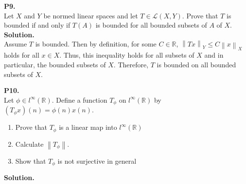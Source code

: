 \documentclass{article}
\newcommand{\norm}[1]{\left\lVert#1\right\rVert}
\begin{document}
    \newpage

    \textbf{P9.}\\

    Let $X$ and $Y$ be normed linear spaces and let $T\in\mathcal{L}(X,Y)$. Prove that $T$ is bounded if and only if $T(A)$ is
    bounded for all bounded subsets of $A$ of $X$.\\

    \textbf{Solution.}\\

    Assume $T$ is bounded. Then by definition, for some $C\in\mathbb{R}$, $\norm{Tx}_Y \leq C\norm{x}_X$ holds for all $x\in X$.
    Thus, this inequality holds for all subsets of $X$ and in particular, the bounded subsets of $X$. Therefore, $T$ is bounded
    on all bounded subsets of $X$.

    \textbf{P10.}\\
    
    Let $\phi\in l^{\infty}(\mathbb{R})$. Define a function $T_{\phi}$ on $l^{\infty}(\mathbb{R})$ by $(T_{\phi}x)(n) = \phi(n)x(n)$.
    \begin{enumerate}
        \item Prove that $T_{\phi}$ is a linear map into $l^{\infty}(\mathbb{R})$
        \item Calculate $\norm{T_{\phi}}$.
        \item Show that $T_{\phi}$ is not surjective in general
    \end{enumerate}

    \textbf{Solution.}
\end{document}
